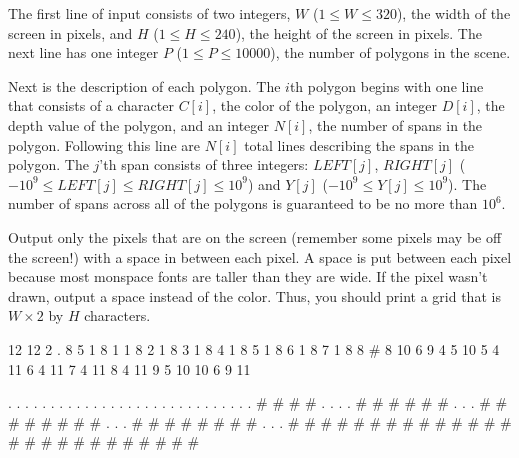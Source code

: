 \begin{formalin}
The first line of input consists of two integers, $W$ ($1 \leq W \leq 320$), the width of the screen in pixels, and $H$ ($1 \leq H \leq 240$), the height of the screen in pixels. The next line has one integer $P$ ($1 \leq P \leq 10000$), the number of polygons in the scene.

Next is the description of each polygon. The $i$th polygon begins with one line that consists of a character $C[i]$, the color of the polygon, an integer $D[i]$, the depth value of the polygon, and an integer $N[i]$, the number of spans in the polygon. Following this line are $N[i]$ total lines describing the spans in the polygon. The $j$'th span consists of three integers: $LEFT[j]$, $RIGHT[j]$ ($-10^{9} \leq LEFT[j] \leq RIGHT[j] \leq 10^{9}$) and $Y[j]$ ($-10^{9} \leq Y[j] \leq 10^{9}$). The number of spans across all of the polygons is guaranteed to be no more than $10^{6}$.
\end{formalin}

\begin{formalout}
Output only the pixels that are on the screen (remember some pixels may be off the screen!) with a space in between each pixel. A space is put between each pixel because most monspace fonts are taller than they are wide. If the pixel wasn't drawn, output a space instead of the color. Thus, you should print a grid that is $W \times 2$ by $H$ characters.
\end{formalout}


\begin{datain}
12 12
2
. 8 5
1 8 1
1 8 2
1 8 3
1 8 4
1 8 5
1 8 6
1 8 7
1 8 8
# 8 10
6 9 4
5 10 5
4 11 6
4 11 7
4 11 8
4 11 9
5 10 10
6 9 11
\end{datain}
\begin{dataout}
                        
  . . . . . . . .       
  . . . . . . . .       
  . . . . . . . .       
  . . . . . # # # #     
  . . . . # # # # # #   
  . . . # # # # # # # # 
  . . . # # # # # # # # 
  . . . # # # # # # # # 
        # # # # # # # # 
          # # # # # #   
            # # # #     

\end{dataout}

